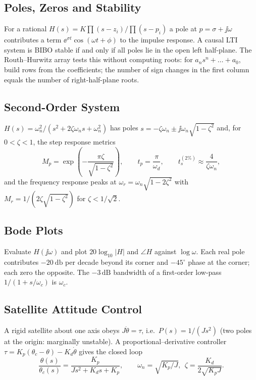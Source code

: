 \documentclass[11pt,a4paper]{article}
\begin{document}
\subsection{Poles, Zeros and Stability}
For a rational $H(s)=K\prod(s-z_i)/\prod(s-p_i)$ a pole at $p=\sigma+\jj\omega$ contributes a term $\ee^{\sigma t}\cos(\omega t+\phi)$ to the impulse response. A causal LTI system is BIBO stable if and only if all poles lie in the open left half-plane. The Routh--Hurwitz array tests this without computing roots: for $a_ns^n+\dots+a_0$, build rows from the coefficients; the number of sign changes in the first column equals the number of right-half-plane roots.

\subsection{Second-Order System}
$H(s)=\omega_n^2/(s^2+2\zeta\omega_ns+\omega_n^2)$ has poles $s=-\zeta\omega_n\pm\jj\omega_n\sqrt{1-\zeta^2}$ and, for $0<\zeta<1$, the step response metrics
\begin{equation}
  M_p=\exp\!\left(-\frac{\pi\zeta}{\sqrt{1-\zeta^2}}\right),\qquad
  t_p=\frac{\pi}{\omega_d},\qquad
  t_s^{(2\%)}\approx\frac{4}{\zeta\omega_n},
  \label{eq:2nd}
\end{equation}
and the frequency response peaks at $\omega_r=\omega_n\sqrt{1-2\zeta^2}$ with $M_r=1/(2\zeta\sqrt{1-\zeta^2})$ for $\zeta<1/\sqrt2$.

\subsection{Bode Plots}
Evaluate $H(\jj\omega)$ and plot $20\log_{10}|H|$ and $\angle H$ against $\log\omega$. Each real pole contributes $-\SI{20}{\decibel}$ per decade beyond its corner and $-45^\circ$ phase at the corner; each zero the opposite. The $-3\,\mathrm{dB}$ bandwidth of a first-order low-pass $1/(1+s/\omega_c)$ is $\omega_c$.

\subsection{Satellite Attitude Control}
A rigid satellite about one axis obeys $J\ddot\theta=\tau$, i.e.\ $P(s)=1/(Js^2)$ (two poles at the origin: marginally unstable). A proportional--derivative controller $\tau=K_p(\theta_c-\theta)-K_d\dot\theta$ gives the closed loop
\begin{equation}
  \frac{\theta(s)}{\theta_c(s)}=\frac{K_p}{Js^2+K_ds+K_p},\qquad
  \omega_n=\sqrt{K_p/J},\ \ \zeta=\frac{K_d}{2\sqrt{K_pJ}}.
  \label{eq:pd}
\end{equation}
\end{document}
